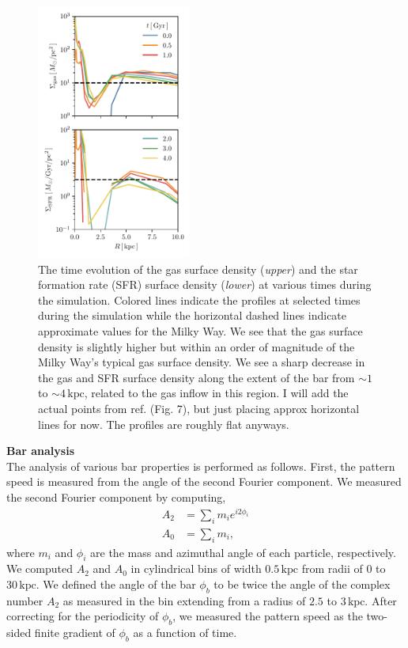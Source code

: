 \documentclass{natureprintstyle}
\begin{document}
\begin{figure}[h]%
\centering
\includegraphics[width=0.45\textwidth]{fig/fig-surf.pdf}
\caption{The time evolution of the gas surface density (\textit{upper}) and
the star formation rate (SFR) surface density (\textit{lower}) at various
times during the simulation. Colored lines indicate the profiles at selected
times during the simulation while the horizontal dashed lines indicate
approximate values for the Milky Way.\cite{2012ARAA..50..531K} We see that the
gas surface density is slightly higher but within an order of magnitude of the
Milky Way's typical gas surface density. We see a sharp decrease in the gas
and SFR surface density along the extent of the bar from $\sim1$ to
$\sim4\,\textrm{kpc}$, related to the gas inflow in this region. {\color{red}
I will add the actual points from ref.\cite{2012ARAA..50..531K} (Fig. 7), but
just placing approx horizontal lines for now. The profiles are roughly flat
anyways.}}
\label{fig:surf}
\end{figure}

\vspace{12pt}

\noindent
{\bf Bar analysis}
\\
\noindent
The analysis of various bar properties is performed as follows. First, the
pattern speed is measured from the angle of the second Fourier component. We measured the second Fourier component by computing,
\begin{equation}
\begin{split}
A_2 &= \sum_i m_i e^{i 2 \phi_i} \\
A_0 &= \sum_i m_i \textrm{,}
\end{split}
\end{equation}
where $m_i$ and $\phi_i$ are the mass and azimuthal angle of each particle, respectively. We
computed $A_2$ and $A_0$ in cylindrical bins of width $0.5\,\textrm{kpc}$ from radii of
$0$ to $30\,\textrm{kpc}$. We defined the angle of the bar $\phi_b$ to be
twice the angle of the complex number $A_2$ as measured in the bin extending from
a radius of $2.5$ to $3\,\textrm{kpc}$. After correcting for the periodicity
of $\phi_b$, we measured the pattern speed as the two-sided finite gradient of
$\phi_b$ as a function of time.
\end{document}
